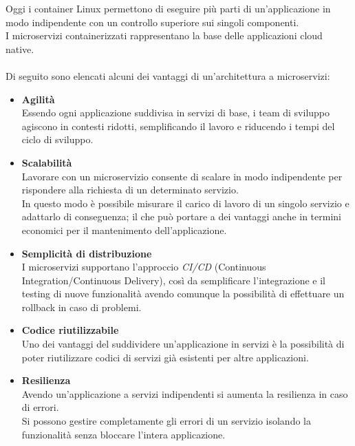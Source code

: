 Oggi i container Linux permettono di eseguire più parti di un'applicazione in modo indipendente con un controllo superiore sui singoli componenti.\\
I microservizi containerizzati rappresentano la base delle applicazioni cloud native. \cite{RedHatDocker}\\ \\
Di seguito sono elencati alcuni dei vantaggi di un'architettura a microservizi:

\begin{itemize}
	\item \textbf{Agilità}\\ Essendo ogni applicazione suddivisa in servizi di base, i team di sviluppo agiscono in contesti ridotti, semplificando il lavoro e riducendo i tempi del ciclo di sviluppo.
	\item \textbf{Scalabilità}\\Lavorare con un microservizio consente di scalare in modo indipendente per rispondere alla richiesta di un determinato servizio.\\ In questo modo è possibile misurare il carico di lavoro di un singolo servizio e adattarlo di conseguenza; il che può portare a dei vantaggi anche in termini economici per il mantenimento dell'applicazione. 
	\item \textbf{Semplicità di distribuzione}\\ I microservizi supportano l'approccio \emph{CI/CD} (Continuous Integration/Continuous Delivery), così da semplificare l'integrazione e il testing di nuove funzionalità avendo comunque la possibilità di effettuare un rollback in caso di problemi.
	\item \textbf{Codice riutilizzabile}\\ Uno dei vantaggi del suddividere un'applicazione in servizi è la possibilità di poter riutilizzare codici di servizi già esistenti per altre applicazioni.
	\item \textbf{Resilienza}\\ Avendo un'applicazione a servizi indipendenti si aumenta la resilienza in caso di errori.\\ Si possono gestire completamente gli errori di un servizio isolando la funzionalità senza bloccare l'intera applicazione.
\end{itemize}

